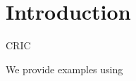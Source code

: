 \chapter{Introduction}


CRIC \cite{mariarputham2015nominated}

We provide examples using \cite{scikit-image}
